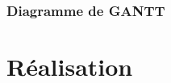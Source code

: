 \documentclass[10pt]{report}
\begin{document}
	\subsection{Diagramme de GANTT}
\chapter{Réalisation}
\end{document}
